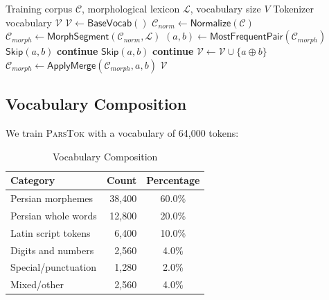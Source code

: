 \documentclass[11pt,a4paper]{article}
\newcommand{\parstok}{\textsc{ParsTok}\xspace}
\begin{document}
\begin{algorithm}[H]
\caption{Morphology-Constrained BPE Training}
\label{alg:bpe}
\begin{algorithmic}[1]
\Require Training corpus $\mathcal{C}$, morphological lexicon $\mathcal{L}$, vocabulary size $V$
\Ensure Tokenizer vocabulary $\mathcal{V}$
\State $\mathcal{V} \leftarrow \mathsf{BaseVocab}()$ 
\State $\mathcal{C}_{\mathit{norm}} \leftarrow \mathsf{Normalize}(\mathcal{C})$
\State $\mathcal{C}_{\mathit{morph}} \leftarrow \mathsf{MorphSegment}(\mathcal{C}_{\mathit{norm}}, \mathcal{L})$ 
    \State $(a, b) \leftarrow \mathsf{MostFrequentPair}(\mathcal{C}_{\mathit{morph}})$
        \State $\mathsf{Skip}(a, b)$ 
        \State \textbf{continue}
    \EndIf
        \State $\mathsf{Skip}(a, b)$ 
        \State \textbf{continue}
    \EndIf
    \State $\mathcal{V} \leftarrow \mathcal{V} \cup \{a \oplus b\}$
    \State $\mathcal{C}_{\mathit{morph}} \leftarrow \mathsf{ApplyMerge}(\mathcal{C}_{\mathit{morph}}, a, b)$
\EndWhile
\State \Return $\mathcal{V}$
\end{algorithmic}
\end{algorithm}

\subsection{Vocabulary Composition}

We train \parstok with a vocabulary of 64{,}000 tokens:

\begin{table}[H]
\centering
\caption{Vocabulary Composition}
\label{tab:vocab}
\begin{tabular}{lrc}
\toprule
\textbf{Category} & \textbf{Count} & \textbf{Percentage} \\
\midrule
Persian morphemes & 38{,}400 & 60.0\% \\
Persian whole words & 12{,}800 & 20.0\% \\
Latin script tokens & 6{,}400 & 10.0\% \\
Digits and numbers & 2{,}560 & 4.0\% \\
Special/punctuation & 1{,}280 & 2.0\% \\
Mixed/other & 2{,}560 & 4.0\% \\
\bottomrule
\end{tabular}
\end{table}
\end{document}
